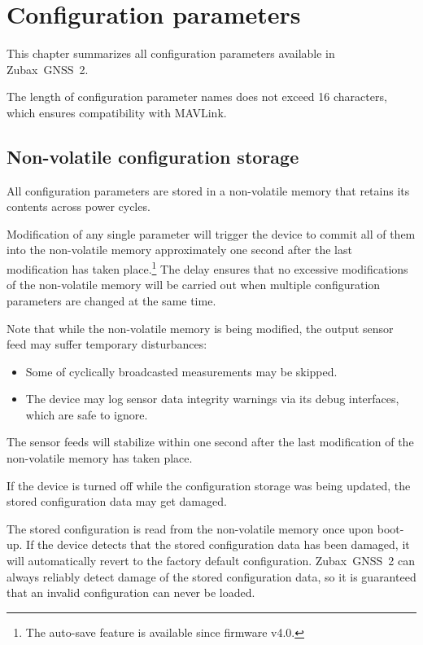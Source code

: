 \documentclass{zubaxdoc}
\begin{document}
%
%

\chapter{Configuration parameters}\label{sec:configuration_parameters}

This chapter summarizes all configuration parameters available in Zubax~GNSS~2.

The length of configuration parameter names does not exceed 16 characters,
which ensures compatibility with MAVLink.

\section{Non-volatile configuration storage}

All configuration parameters are stored in a non-volatile memory
that retains its contents across power cycles.

Modification of any single parameter will trigger the device to commit all of them into the non-volatile
memory approximately one second after the last modification has taken
place.\footnote{The auto-save feature is available since firmware v4.0.}
The delay ensures that no excessive modifications of the non-volatile memory will be carried out
when multiple configuration parameters are changed at the same time.

Note that while the non-volatile memory is being modified,
the output sensor feed may suffer temporary disturbances:
\begin{itemize}
    \item Some of cyclically broadcasted measurements may be skipped.
    \item The device may log sensor data integrity warnings via its debug interfaces, which are safe to ignore.
\end{itemize}
The sensor feeds will stabilize within one second after the last modification of the
non-volatile memory has taken place.

If the device is turned off while the configuration storage was being updated,
the stored configuration data may get damaged.

The stored configuration is read from the non-volatile memory once upon boot-up.
If the device detects that the stored configuration data has been damaged,
it will automatically revert to the factory default configuration.
Zubax~GNSS~2 can always reliably detect damage of the stored configuration data,
so it is guaranteed that an invalid configuration can never be loaded.
\end{document}
